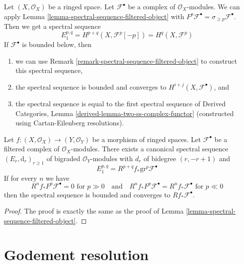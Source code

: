 \begin{example}
\label{example-spectral-sequence-bis}
Let $(X, \mathcal{O}_X)$ be a ringed space. Let $\mathcal{F}^\bullet$ be a
complex of $\mathcal{O}_X$-modules. We can apply
Lemma \ref{lemma-spectral-sequence-filtered-object}
with $F^p\mathcal{F}^\bullet = \sigma_{\geq p}\mathcal{F}^\bullet$.
Then we get a spectral sequence
$$
E_1^{p, q} = H^{p + q}(X, \mathcal{F}^p[-p]) = H^q(X, \mathcal{F}^p)
$$
If $\mathcal{F}^\bullet$ is bounded below, then
\begin{enumerate}
\item we can use
Remark \ref{remark-spectral-sequence-filtered-object}
to construct this spectral sequence,
\item the spectral sequence is bounded and converges to
$H^{i + j}(X, \mathcal{F}^\bullet)$, and
\item the spectral sequence is equal to the first spectral sequence of
Derived Categories, Lemma \ref{derived-lemma-two-ss-complex-functor}
(constructed using Cartan-Eilenberg resolutions).
\end{enumerate}
\end{example}

\begin{lemma}
\label{lemma-relative-spectral-sequence-filtered-object}
Let $f : (X, \mathcal{O}_X) \to (Y, \mathcal{O}_Y)$ be a morphism of
ringed spaces. Let $\mathcal{F}^\bullet$ be a filtered complex of
$\mathcal{O}_X$-modules. There exists a canonical spectral sequence
$(E_r, \text{d}_r)_{r \geq 1}$ of bigraded
$\mathcal{O}_Y$-modules with $d_r$ of bidegree $(r, -r + 1)$ and
$$
E_1^{p, q} = R^{p + q}f_*\text{gr}^p\mathcal{F}^\bullet
$$
If for every $n$ we have
$$
R^nf_*F^p\mathcal{F}^\bullet = 0 \text{ for }p \gg 0
\quad\text{and}\quad
R^nf_*F^p\mathcal{F}^\bullet = R^nf_*\mathcal{F}^\bullet \text{ for }p \ll 0
$$
then the spectral sequence is bounded and converges to
$Rf_*\mathcal{F}^\bullet$.
\end{lemma}

\begin{proof}
The proof is exactly the same as the proof of
Lemma \ref{lemma-spectral-sequence-filtered-object}.
\end{proof}





\section{Godement resolution}
\label{section-godement}

